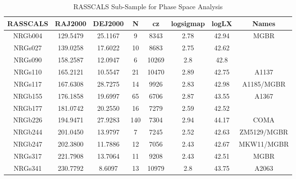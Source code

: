 \begin{table}
\caption{RASSCALS Sub-Sample for Phase Space Analysis}
\begin{tabular}{cccccccc}
\hline \hline
RASSCALS & RAJ2000 & DEJ2000 & N & cz & logsigmap & logLX & Names \\
\hline
NRGb004 & 129.5479 & 25.1167 & 9 & 8343 & 2.78 & 42.94 & MGBR \\
NRGs027 & 139.0258 & 17.6022 & 10 & 8683 & 2.75 & 42.62 &  \\
NRGs090 & 158.2587 & 12.0947 & 6 & 10269 & 2.8 & 42.8 &  \\
NRGs110 & 165.2121 & 10.5547 & 21 & 10470 & 2.89 & 42.75 & A1137 \\
NRGs117 & 167.6308 & 28.7275 & 14 & 9926 & 2.83 & 42.98 & A1185/MGBR \\
NRGb155 & 176.1858 & 19.6997 & 65 & 6706 & 2.87 & 43.55 & A1367 \\
NRGb177 & 181.0742 & 20.2550 & 16 & 7279 & 2.59 & 42.52 &  \\
NRGb226 & 194.9471 & 27.9283 & 140 & 7304 & 2.94 & 44.17 & COMA \\
NRGb244 & 201.0450 & 13.9797 & 7 & 7245 & 2.52 & 42.63 & ZM5129/MGBR \\
NRGb247 & 202.3800 & 11.7886 & 12 & 7056 & 2.43 & 42.67 & MKW11/MGBR \\
NRGs317 & 221.7908 & 13.7064 & 11 & 9208 & 2.43 & 42.51 & MGBR \\
NRGs341 & 230.7792 & 8.6097 & 13 & 10979 & 2.8 & 43.75 & A2063 \\
\hline
\end{tabular}
\end{table}
